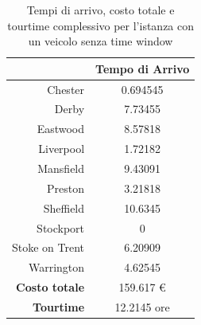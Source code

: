 
		\begin{table}[H]
			\tiny
			\centering
			\label{table:instance_1_arrival}
			\begin{tabular}{rc}

				\toprule
				& Tempo di Arrivo \\

				\midrule
				Chester & 0.694545 \\
				Derby & 7.73455 \\
				Eastwood & 8.57818 \\
				Liverpool & 1.72182 \\
				Mansfield & 9.43091 \\
				Preston & 3.21818 \\
				Sheffield & 10.6345 \\
				Stockport  & 0 \\
				Stoke on Trent & 6.20909 \\
				Warrington & 4.62545 \\
				\midrule
				\textbf{Costo totale} & 159.617 € \\
				\textbf{Tourtime} & 12.2145 ore \\
				\bottomrule
			\end{tabular}
			\label{table:instance_1_totale}
			\caption{Tempi di arrivo, costo totale e tourtime complessivo per l'istanza con un veicolo senza time window}
		\end{table}


